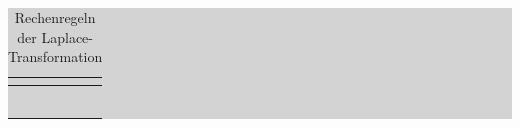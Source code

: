 \begin{table}[H]
\setlength{\arrayrulewidth}{.1em}
\caption{Rechenregeln der Laplace-Transformation}
\setlength{\fboxsep}{0pt}%
\colorbox{lightgray}{%
%
\begin{tabular}{| c | c | c |}
\hline
\parbox[c][0.3in][c]{1.9in}{\smallskip\centering\textbf{\selectfont{Regel}}} & \parbox[c][0.3in][c]{2.2in}{\smallskip\centering\textbf{\selectfont{Funktion x(t)}}} &
\parbox[c][0.3in][c]{2.2in}{\smallskip\centering\textbf{\selectfont{Laplace-Transformierte X(s)}}}\\ \hline


\parbox[c][0.5in][c]{1.9in}{} & 
\parbox[c][0.5in][c]{2.2in}{} &
\parbox[c][0.5in][c]{2.2in}{}\\
\hline

\parbox[c][0.5in][c]{1.9in}{} & 
\parbox[c][0.5in][c]{2.2in}{} &
\parbox[c][0.5in][c]{2.2in}{}\\
\hline

\parbox[c][0.5in][c]{1.9in}{} & 
\parbox[c][0.5in][c]{2.2in}{} &
\parbox[c][0.5in][c]{2.2in}{}\\
\hline

\parbox[c][0.5in][c]{1.9in}{} & 
\parbox[c][0.5in][c]{2.2in}{} &
\parbox[c][0.5in][c]{2.2in}{}\\
\hline

\parbox[c][0.5in][c]{1.9in}{} & 
\parbox[c][0.5in][c]{2.2in}{} &
\parbox[c][0.5in][c]{2.2in}{}\\
\hline

\parbox[c][0.5in][c]{1.9in}{} & 
\parbox[c][0.5in][c]{2.2in}{} &
\parbox[c][0.5in][c]{2.2in}{}\\
\hline


\end{tabular}}
\end{table}
